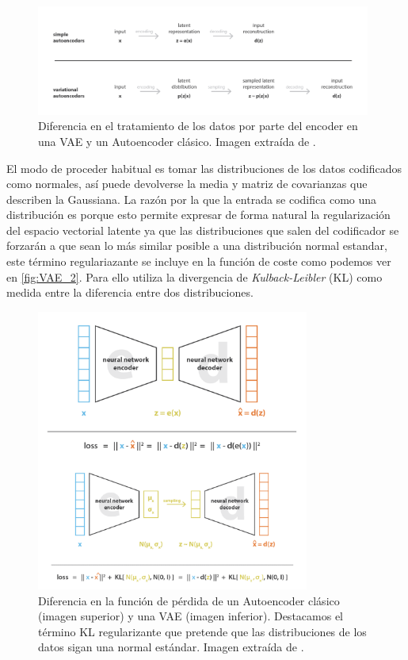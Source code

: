             \begin{figure}[!h]
                \centering
                \includegraphics[width=0.98\textwidth]{img/vae_1.png}
                \caption{Diferencia en el tratamiento de los datos por parte del encoder en una VAE y un Autoencoder clásico. Imagen extraída de \cite{VAE}.}
                \label{fig:VAE_1}
            \end{figure}

            \noindent El modo de proceder habitual es tomar las distribuciones de los datos codificados como normales, así puede devolverse la media y matriz de covarianzas que describen la Gaussiana. La razón por la que la entrada se codifica como una distribución es porque esto permite expresar de forma natural la regularización del espacio vectorial latente ya que las distribuciones que salen del codificador se forzarán a que sean lo más similar posible a una distribución normal estandar, este término regulariazante se incluye en la función de coste como podemos ver en \autoref{fig:VAE_2}. Para ello utiliza la divergencia de \textit{Kulback-Leibler} (KL) como medida entre la diferencia entre dos distribuciones.

            \begin{figure}[!h]
                \centering
                \includegraphics[width=0.8\textwidth]{img/vae_2.png}
                \caption{Diferencia en la función de pérdida de un Autoencoder clásico (imagen superior) y una VAE (imagen inferior). Destacamos el término KL regularizante que pretende que las distribuciones de los datos sigan una normal estándar. Imagen extraída de \cite{VAE}.}
                \label{fig:VAE_2}
            \end{figure}
        
